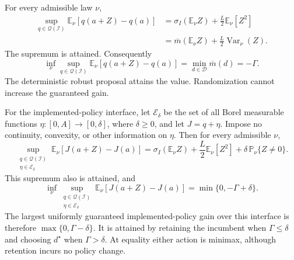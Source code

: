 \begin{proposition}
\label{prop:informationminimax122}
For every admissible law $\nu$,
\begin{align}
 \sup_{q\in\mathcal Q(\mathcal I)}
     \mathbb E_\nu[q(a+Z)-q(a)]
 &=\sigma_I(\mathbb E_\nu Z)+\frac L2\mathbb E_\nu[Z^2]
       \label{eq:qrandomsharp122}\\
 &=\overline m(\mathbb E_\nu Z)
       +\frac L2\operatorname{Var}_\nu(Z).
       \nonumber
\end{align}
The supremum is attained. Consequently
\begin{equation}\label{eq:qminimax122}
 \inf_{\nu}\sup_{q\in\mathcal Q(\mathcal I)}
     \mathbb E_\nu[q(a+Z)-q(a)]
   =\min_{d\in\mathcal D}\overline m(d)=-\Gamma.
\end{equation}
The deterministic robust proposal attains the value. Randomization cannot
increase the guaranteed gain.

For the implemented-policy interface, let $\mathcal E_\delta$ be the set
of all Borel measurable functions $\eta:[0,A]\to[0,\delta]$, where
$\delta\ge0$, and let $J=q+\eta$. Impose no continuity, convexity, or other
information on $\eta$. Then for every admissible $\nu$,
\begin{equation}\label{eq:jrandomsharp122}
 \sup_{\substack{q\in\mathcal Q(\mathcal I)\\
                  \eta\in\mathcal E_\delta}}
     \mathbb E_\nu[J(a+Z)-J(a)]
 =\sigma_I(\mathbb E_\nu Z)+\frac L2\mathbb E_\nu[Z^2]
        +\delta\,\mathbb P_\nu\{Z\ne0\}.
\end{equation}
This supremum also is attained, and
\begin{equation}\label{eq:jminimax122}
 \inf_{\nu}\sup_{\substack{q\in\mathcal Q(\mathcal I)\\
                           \eta\in\mathcal E_\delta}}
     \mathbb E_\nu[J(a+Z)-J(a)]
   =\min\{0,-\Gamma+\delta\}.
\end{equation}
The largest uniformly guaranteed implemented-policy gain over this
interface is therefore $\max\{0,\Gamma-\delta\}$. It is attained by
retaining the incumbent when $\Gamma\le\delta$ and choosing $d^\star$
when $\Gamma>\delta$. At equality either action is minimax, although
retention incurs no policy change.
\end{proposition}

